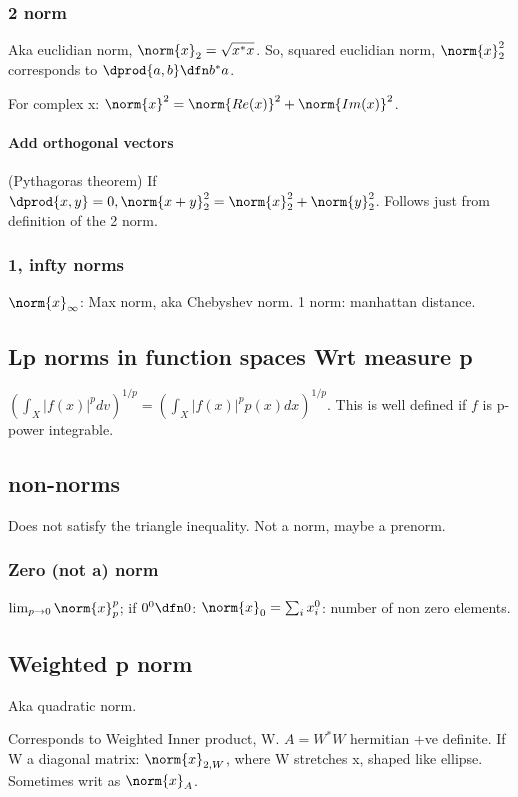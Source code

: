 \documentclass[oneside, article]{memoir}
\begin{document}
\subsubsection{2 norm}
Aka euclidian norm, $\norm{x}_{2} = \sqrt{x^{*}x}$. So, squared euclidian norm, $\norm{x}_2^{2}$ corresponds to $\dprod{a, b}\dfn b^{*}a$.

For complex x: $\norm{x}^{2} = \norm{Re(x)}^{2} + \norm{Im(x)}^{2}$.

\paragraph*{Add orthogonal vectors}
(Pythagoras theorem) If $\dprod{x, y} = 0, \norm{x+y}_2^{2} = \norm{x}_2^{2} + \norm{y}_2^{2}$. Follows just from definition of the 2 norm.

\subsubsection{1, infty norms}
$\norm{x}_{\infty}$: Max norm, aka Chebyshev norm. 1 norm: manhattan distance.

\subsection{Lp norms in function spaces Wrt measure p}
$(\int_X |f(x)|^{p} dv)^{1/p} = (\int_X |f(x)|^{p} p(x)dx)^{1/p}$. This is well defined if $f$ is p-power integrable.

\subsection{ non-norms}
Does not satisfy the triangle inequality. Not a norm, maybe a prenorm.

\subsubsection{Zero (not a) norm}
$\lim_{p \to 0} \norm{x}_{p}^{p}$; if $0^{0} \dfn 0$: $\norm{x}_{0} = \sum_{i} x_{i}^{0}$: number of non zero elements.

\subsection{Weighted p norm}
Aka quadratic norm.

Corresponds to Weighted Inner product, W. $A = W^{*}W$ hermitian +ve definite. If W a diagonal matrix: $\norm{x}_{2,W}$, where W stretches x, shaped like ellipse. Sometimes writ as $\norm{x}_{A}$.
\end{document}
